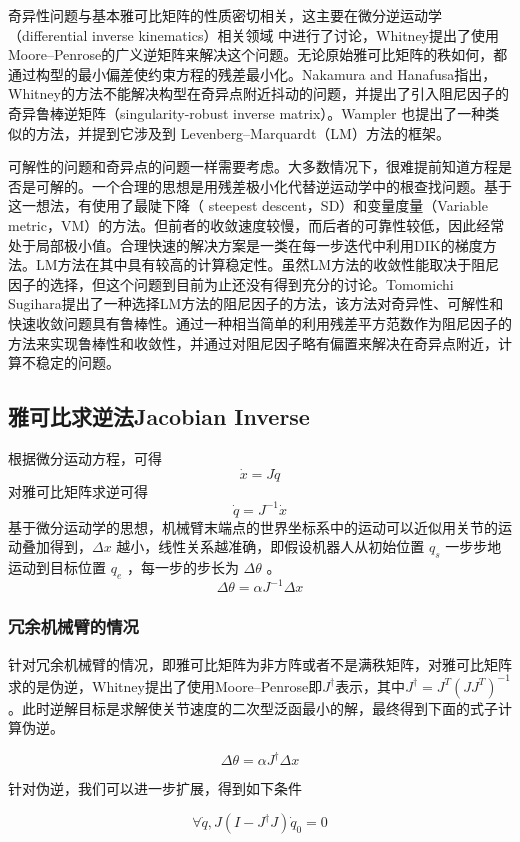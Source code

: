 奇异性问题与基本雅可比矩阵的性质密切相关，这主要在微分逆运动学（differential inverse kinematics）相关领域 中进行了讨论，Whitney提出了使用Moore–Penrose的广义逆矩阵来解决这个问题。无论原始雅可比矩阵的秩如何，都通过构型的最小偏差使约束方程的残差最小化。Nakamura and Hanafusa指出，Whitney的方法不能解决构型在奇异点附近抖动的问题，并提出了引入阻尼因子的奇异鲁棒逆矩阵（singularity-robust inverse matrix）。Wampler 也提出了一种类似的方法，并提到它涉及到 Levenberg–Marquardt（LM）方法的框架。

可解性的问题和奇异点的问题一样需要考虑。大多数情况下，很难提前知道方程是否是可解的。一个合理的思想是用残差极小化代替逆运动学中的根查找问题。基于这一想法，有使用了最陡下降（ steepest descent，SD）和变量度量（Variable metric，VM）的方法。但前者的收敛速度较慢，而后者的可靠性较低，因此经常处于局部极小值。合理快速的解决方案是一类在每一步迭代中利用DIK的梯度方法。LM方法在其中具有较高的计算稳定性。虽然LM方法的收敛性能取决于阻尼因子的选择，但这个问题到目前为止还没有得到充分的讨论。Tomomichi Sugihara提出了一种选择LM方法的阻尼因子的方法，该方法对奇异性、可解性和快速收敛问题具有鲁棒性。通过一种相当简单的利用残差平方范数作为阻尼因子的方法来实现鲁棒性和收敛性，并通过对阻尼因子略有偏置来解决在奇异点附近，计算不稳定的问题。
\subsection{雅可比求逆法Jacobian Inverse}
根据微分运动方程，可得
\begin{equation*}
  \dot{x} = J \dot{q}
\end{equation*}
对雅可比矩阵求逆可得
\begin{equation*}
  \dot{q} = J^{-1}\dot{x}
\end{equation*}
基于微分运动学的思想，机械臂末端点的世界坐标系中的运动可以近似用关节的运动叠加得到，$\Delta x$ 越小，线性关系越准确，即假设机器人从初始位置 $q_s$ 一步步地运动到目标位置 $q_e$ ，每一步的步长为 $\Delta \theta$ 。
\begin{equation*}
  \Delta \theta = \alpha J^{-1}\Delta x
\end{equation*}
\subsubsection{冗余机械臂的情况}
针对冗余机械臂的情况，即雅可比矩阵为非方阵或者不是满秩矩阵，对雅可比矩阵求的是伪逆，Whitney提出了使用Moore–Penrose即$J^{\dagger}$表示，其中$J^{\dagger} = J^T(JJ^T)^{-1}$。此时逆解目标是求解使关节速度的二次型泛函最小的解，最终得到下面的式子计算伪逆。
\begin{theorembox}
\begin{equation*}
  \Delta \theta = \alpha J^{\dagger}\Delta x
\end{equation*}
\end{theorembox}
针对伪逆，我们可以进一步扩展，得到如下条件
\begin{theorembox}
\begin{equation*}
  \forall \dot{q}, J(I-J^{\dagger}J)\dot{q}_0 = 0
\end{equation*}
\end{theorembox}
